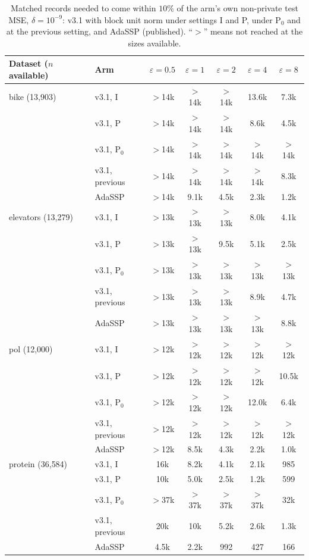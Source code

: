 \documentclass[11pt]{article}
\theoremstyle{definition}
\theoremstyle{plain}
\begin{document}
\begin{table}[t]
  \centering
  \small
  \caption{Matched records needed to come within $10\%$ of the arm's own non-private test MSE, $\delta = 10^{-9}$: v3.1 with block unit norm under settings I and P, under P$_0$ and at the previous setting, and AdaSSP (published). ``$>$'' means not reached at the sizes available.}
  \label{tab:sweep_v31}
  \begin{tabular}{@{}llccccc@{}}
    \toprule
    Dataset ($n$ available) & Arm & $\varepsilon = 0.5$ & $\varepsilon = 1$ & $\varepsilon = 2$ & $\varepsilon = 4$ & $\varepsilon = 8$ \\
    \midrule
    bike (13{,}903) & v3.1, I & $>$14k & $>$14k & $>$14k & 13.6k & 7.3k \\
     & v3.1, P & $>$14k & $>$14k & $>$14k & 8.6k & 4.5k \\
     & v3.1, P$_0$ & $>$14k & $>$14k & $>$14k & $>$14k & $>$14k \\
     & v3.1, previous & $>$14k & $>$14k & $>$14k & $>$14k & 8.3k \\
     & AdaSSP & $>$14k & 9.1k & 4.5k & 2.3k & 1.2k \\
    \midrule
    elevators (13{,}279) & v3.1, I & $>$13k & $>$13k & $>$13k & 8.0k & 4.1k \\
     & v3.1, P & $>$13k & $>$13k & 9.5k & 5.1k & 2.5k \\
     & v3.1, P$_0$ & $>$13k & $>$13k & $>$13k & $>$13k & $>$13k \\
     & v3.1, previous & $>$13k & $>$13k & $>$13k & 8.9k & 4.7k \\
     & AdaSSP & $>$13k & $>$13k & $>$13k & $>$13k & 8.8k \\
    \midrule
    pol (12{,}000) & v3.1, I & $>$12k & $>$12k & $>$12k & $>$12k & $>$12k \\
     & v3.1, P & $>$12k & $>$12k & $>$12k & $>$12k & 10.5k \\
     & v3.1, P$_0$ & $>$12k & $>$12k & $>$12k & 12.0k & 6.4k \\
     & v3.1, previous & $>$12k & $>$12k & $>$12k & $>$12k & $>$12k \\
     & AdaSSP & $>$12k & 8.5k & 4.3k & 2.2k & 1.0k \\
    \midrule
    protein (36{,}584) & v3.1, I & 16k & 8.2k & 4.1k & 2.1k & 985 \\
     & v3.1, P & 10k & 5.0k & 2.5k & 1.2k & 599 \\
     & v3.1, P$_0$ & $>$37k & $>$37k & $>$37k & $>$37k & 32k \\
     & v3.1, previous & 20k & 10k & 5.2k & 2.6k & 1.3k \\
     & AdaSSP & 4.5k & 2.2k & 992 & 427 & 166 \\
    \bottomrule
  \end{tabular}
\end{table}
\end{document}
